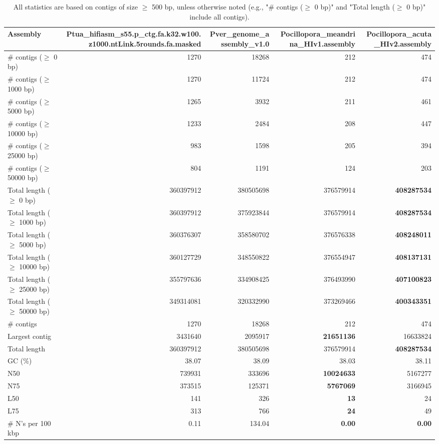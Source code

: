 \documentclass[12pt,a4paper]{article}
\begin{document}
\begin{table}[ht]
\begin{center}
\caption{All statistics are based on contigs of size $\geq$ 500 bp, unless otherwise noted (e.g., "\# contigs ($\geq$ 0 bp)" and "Total length ($\geq$ 0 bp)" include all contigs).}
\begin{tabular}{|l*{4}{|r}|}
\hline
Assembly & Ptua\_hifiasm\_s55.p\_ctg.fa.k32.w100.z1000.ntLink.5rounds.fa.masked & Pver\_genome\_assembly\_v1.0 & Pocillopora\_meandrina\_HIv1.assembly & Pocillopora\_acuta\_HIv2.assembly \\ \hline
\# contigs ($\geq$ 0 bp) & 1270 & 18268 & 212 & 474 \\ \hline
\# contigs ($\geq$ 1000 bp) & 1270 & 11724 & 212 & 474 \\ \hline
\# contigs ($\geq$ 5000 bp) & 1265 & 3932 & 211 & 461 \\ \hline
\# contigs ($\geq$ 10000 bp) & 1233 & 2484 & 208 & 447 \\ \hline
\# contigs ($\geq$ 25000 bp) & 983 & 1598 & 205 & 394 \\ \hline
\# contigs ($\geq$ 50000 bp) & 804 & 1191 & 124 & 203 \\ \hline
Total length ($\geq$ 0 bp) & 360397912 & 380505698 & 376579914 & {\bf 408287534} \\ \hline
Total length ($\geq$ 1000 bp) & 360397912 & 375923844 & 376579914 & {\bf 408287534} \\ \hline
Total length ($\geq$ 5000 bp) & 360376307 & 358580702 & 376576338 & {\bf 408248011} \\ \hline
Total length ($\geq$ 10000 bp) & 360127729 & 348550822 & 376554947 & {\bf 408137131} \\ \hline
Total length ($\geq$ 25000 bp) & 355797636 & 334908425 & 376493990 & {\bf 407100823} \\ \hline
Total length ($\geq$ 50000 bp) & 349314081 & 320332990 & 373269466 & {\bf 400343351} \\ \hline
\# contigs & 1270 & 18268 & 212 & 474 \\ \hline
Largest contig & 3431640 & 2095917 & {\bf 21651136} & 16633824 \\ \hline
Total length & 360397912 & 380505698 & 376579914 & {\bf 408287534} \\ \hline
GC (\%) & 38.07 & 38.09 & 38.03 & 38.11 \\ \hline
N50 & 739931 & 333696 & {\bf 10024633} & 5167277 \\ \hline
N75 & 373515 & 125371 & {\bf 5767069} & 3166945 \\ \hline
L50 & 141 & 326 & {\bf 13} & 24 \\ \hline
L75 & 313 & 766 & {\bf 24} & 49 \\ \hline
\# N's per 100 kbp & 0.11 & 134.04 & {\bf 0.00} & {\bf 0.00} \\ \hline
\end{tabular}
\end{center}
\end{table}
\end{document}
